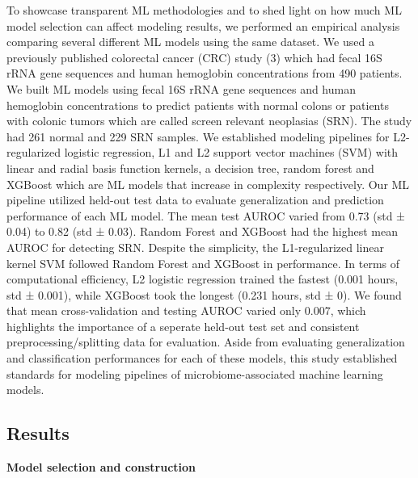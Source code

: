 \documentclass[11pt,]{article}
\begin{document}
To showcase transparent ML methodologies and to shed light on how much
ML model selection can affect modeling results, we performed an
empirical analysis comparing several different ML models using the same
dataset. We used a previously published colorectal cancer (CRC) study
(3) which had fecal 16S rRNA gene sequences and human hemoglobin
concentrations from 490 patients. We built ML models using fecal 16S
rRNA gene sequences and human hemoglobin concentrations to predict
patients with normal colons or patients with colonic tumors which are
called screen relevant neoplasias (SRN). The study had 261 normal and
229 SRN samples. We established modeling pipelines for L2-regularized
logistic regression, L1 and L2 support vector machines (SVM) with linear
and radial basis function kernels, a decision tree, random forest and
XGBoost which are ML models that increase in complexity respectively.
Our ML pipeline utilized held-out test data to evaluate generalization
and prediction performance of each ML model. The mean test AUROC varied
from 0.73 (std ± 0.04) to 0.82 (std ± 0.03). Random Forest and XGBoost
had the highest mean AUROC for detecting SRN. Despite the simplicity,
the L1-regularized linear kernel SVM followed Random Forest and XGBoost
in performance. In terms of computational efficiency, L2 logistic
regression trained the fastest (0.001 hours, std ± 0.001), while XGBoost
took the longest (0.231 hours, std ± 0). We found that mean
cross-validation and testing AUROC varied only 0.007, which highlights
the importance of a seperate held-out test set and consistent
preprocessing/splitting data for evaluation. Aside from evaluating
generalization and classification performances for each of these models,
this study established standards for modeling pipelines of
microbiome-associated machine learning models.

\subsection{Results}\label{results}

\textbf{Model selection and construction}
\end{document}
